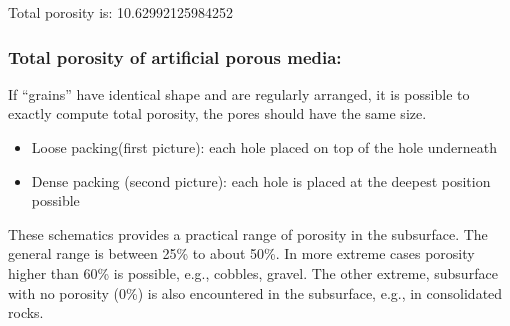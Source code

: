 \documentclass[letterpaper,10pt,english]{sphinxmanual}
\let\sphinxpxdimen\pdfpxdimen\else\newdimen\sphinxpxdimen
\begin{document}
\begin{sphinxVerbatim}[commandchars=\\\{\}]
  
 


   
\end{sphinxVerbatim}

\begin{sphinxVerbatim}[commandchars=\\\{\}]
 Total porosity is: 10.62992125984252 \PYGZpc{}
\end{sphinxVerbatim}


\subsubsection{Total porosity of artificial porous media:}
\label{\detokenize{contents/flow/12_subsurface_structure:total-porosity-of-artificial-porous-media}}
If “grains” have identical shape and are regularly arranged, it is possible to exactly compute total porosity, the pores should have the same size.

\noindent{\hspace*{\fill}\sphinxincludegraphics[height=300\sphinxpxdimen]{{L02_fig5}.png}\hspace*{\fill}}
\begin{itemize}
\item {} 
Loose packing(first picture): each hole placed on top of the hole underneath

\item {} 
Dense packing (second picture): each hole is placed at the deepest position possible

\end{itemize}

These schematics provides a practical range of porosity in the subsurface. The general range is between 25\% to about 50\%. In more extreme cases porosity higher than 60\% is possible, e.g., cobbles, gravel. The other extreme, subsurface with no porosity (0\%) is also encountered in the subsurface, e.g., in consolidated rocks.
\end{document}
